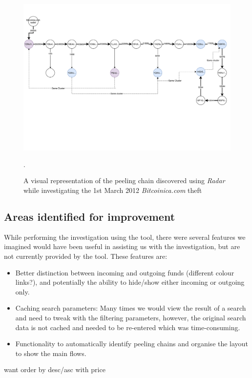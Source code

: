 \begin{figure}[h!]
  \centering
  \includegraphics[width = 15cm]{./figures/bitcoinicapeelingchain}\\[0.5cm]
  \caption{A visual representation of the peeling chain discovered using \textit{Radar} while investigating the 1st March 2012 \textit{Bitcoinica.com} theft}.
  \label{fig:bitcoinica-peel-chain}
\end{figure}

\subsection{Areas identified for improvement}
While performing the investigation using the tool, there were several features we imagined would have been useful in assisting us with the investigation, but are not currently provided by the tool. These features are:
\begin{itemize}
    \item Better distinction between incoming and outgoing funds (different colour links?), and potentially the ability to hide/show either incoming or outgoing only.
    \item Caching search parameters: Many times we would view the result of a search and need to tweak with the filtering parameters, however, the original search data is not cached and needed to be re-entered which was time-consuming.
    \item Functionality to automatically identify peeling chains and organise the layout to show the main flows. 
\end{itemize}

want order by desc/asc with price

